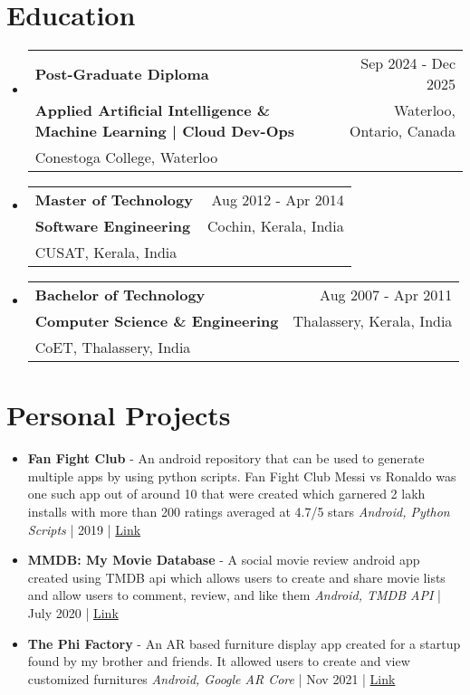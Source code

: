 \documentclass[11pt,a4paper]{article}
\makeatletter
\newcommand{\resumeThreeLineSubheading}[6]{
  \vspace{-1pt}\item
    \begin{tabular*}{0.97\textwidth}[t]{l@{\extracolsep{\fill}}r}
      \textbf{#1} & \normalfont #2 \\  %
      \textbf{\normalfont #3} & \normalfont #4 \\  %
      \normalfont #5 & \normalfont #6 \\  %
    \end{tabular*}\vspace{-5pt}
}
\makeatother
\begin{document}
\section{Education}
\begin{itemize}[leftmargin=0.15in, label={}]
\resumeThreeLineSubheading
  {Post-Graduate Diploma}
  {Sep 2024 - Dec 2025}
  {Applied Artificial Intelligence \& Machine Learning | Cloud Dev-Ops}
  {Waterloo, Ontario, Canada}
  {Conestoga College, Waterloo}
  {}

\resumeThreeLineSubheading
  {Master of Technology}
  {Aug 2012 - Apr 2014}
  {Software Engineering}
  {Cochin, Kerala, India}
  {CUSAT, Kerala, India}
  {}

\resumeThreeLineSubheading
  {Bachelor of Technology}
  {Aug 2007 - Apr 2011}
  {Computer Science \& Engineering}
  {Thalassery, Kerala, India}
  {CoET, Thalassery, India}
  {}


\end{itemize}

\section{Personal Projects}
\begin{itemize}[leftmargin=0.15in, label={}]
    \item \textbf{Fan Fight Club} - An android repository that can be used to generate multiple apps by using python scripts. Fan Fight Club Messi vs Ronaldo was one such app out of around 10 that were created which garnered 2 lakh installs with more than 200 ratings averaged at 4.7/5 stars
          \textit{Android, Python Scripts} | 2019 | \href{https://bitbucket.org/nikhilshankarcs/fanfightclub}{Link}

    \item \textbf{MMDB: My Movie Database} - A social movie review android app created using TMDB api which allows users to create and share movie lists and allow users to comment, review, and like them
          \textit{Android, TMDB API} | July 2020 | \href{https://bitbucket.org/nikhilshankarcs/mmdb}{Link}

    \item \textbf{The Phi Factory} - An AR based furniture display app created for a startup found by my brother and friends. It allowed users to create and view customized furnitures
          \textit{Android, Google AR Core} | Nov 2021 | \href{https://bitbucket.org/nikhilshankarcs/phifactory}{Link}


\end{itemize}
\end{document}
